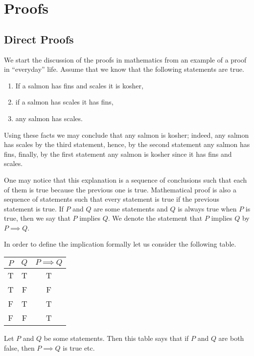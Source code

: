 \exercise\chapter{Proofs}
\section{Direct Proofs}

We start the discussion of the proofs in mathematics from an example of a proof
in ``everyday'' life. Assume that we know that the following statements are
true.
\begin{enumerate}
  \item If a salmon has fins and scales it is kosher,
  \item if a salmon has scales it has fins,
  \item any salmon has scales.
\end{enumerate}
Using these facts we may conclude that any salmon is kosher; indeed, any salmon
has scales by the third statement, hence, by the second statement any salmon has
fins, finally, by the first statement any salmon is kosher since it has fins and
scales.

One may notice that this explanation is a sequence of conclusions such that
each of them is true because the previous one is true.
Mathematical proof is also a sequence of statements such that every statement
is true if the previous statement is true. If $P$ and $Q$ are some statements
and $Q$ is always true when $P$ is true, then we say that $P$ implies $Q$.
We denote the statement that $P$ implies $Q$ by $P \implies Q$.



In order to define the implication formally let us consider the following table.
\begin{center}
  \begin{tabular}{ c | c | c }
    $P$ & $Q$ & $P \implies Q$ \\ \hline
    T   & T   & T \\
    T   & F   & F \\
    F   & T   & T \\
    F   & F   & T \\
  \end{tabular}
\end{center}
Let $P$ and $Q$ be some statements. Then this table says that if $P$ and $Q$
are both false, then $P \implies Q$ is true etc.

